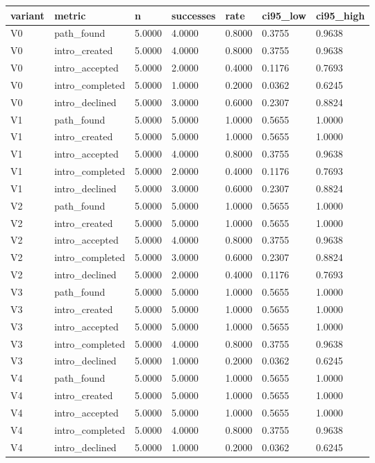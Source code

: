 \begin{tabular}{lllllll}
\toprule
variant & metric & n & successes & rate & ci95_low & ci95_high \\
\midrule
V0 & path_found & 5.0000 & 4.0000 & 0.8000 & 0.3755 & 0.9638 \\
V0 & intro_created & 5.0000 & 4.0000 & 0.8000 & 0.3755 & 0.9638 \\
V0 & intro_accepted & 5.0000 & 2.0000 & 0.4000 & 0.1176 & 0.7693 \\
V0 & intro_completed & 5.0000 & 1.0000 & 0.2000 & 0.0362 & 0.6245 \\
V0 & intro_declined & 5.0000 & 3.0000 & 0.6000 & 0.2307 & 0.8824 \\
V1 & path_found & 5.0000 & 5.0000 & 1.0000 & 0.5655 & 1.0000 \\
V1 & intro_created & 5.0000 & 5.0000 & 1.0000 & 0.5655 & 1.0000 \\
V1 & intro_accepted & 5.0000 & 4.0000 & 0.8000 & 0.3755 & 0.9638 \\
V1 & intro_completed & 5.0000 & 2.0000 & 0.4000 & 0.1176 & 0.7693 \\
V1 & intro_declined & 5.0000 & 3.0000 & 0.6000 & 0.2307 & 0.8824 \\
V2 & path_found & 5.0000 & 5.0000 & 1.0000 & 0.5655 & 1.0000 \\
V2 & intro_created & 5.0000 & 5.0000 & 1.0000 & 0.5655 & 1.0000 \\
V2 & intro_accepted & 5.0000 & 4.0000 & 0.8000 & 0.3755 & 0.9638 \\
V2 & intro_completed & 5.0000 & 3.0000 & 0.6000 & 0.2307 & 0.8824 \\
V2 & intro_declined & 5.0000 & 2.0000 & 0.4000 & 0.1176 & 0.7693 \\
V3 & path_found & 5.0000 & 5.0000 & 1.0000 & 0.5655 & 1.0000 \\
V3 & intro_created & 5.0000 & 5.0000 & 1.0000 & 0.5655 & 1.0000 \\
V3 & intro_accepted & 5.0000 & 5.0000 & 1.0000 & 0.5655 & 1.0000 \\
V3 & intro_completed & 5.0000 & 4.0000 & 0.8000 & 0.3755 & 0.9638 \\
V3 & intro_declined & 5.0000 & 1.0000 & 0.2000 & 0.0362 & 0.6245 \\
V4 & path_found & 5.0000 & 5.0000 & 1.0000 & 0.5655 & 1.0000 \\
V4 & intro_created & 5.0000 & 5.0000 & 1.0000 & 0.5655 & 1.0000 \\
V4 & intro_accepted & 5.0000 & 5.0000 & 1.0000 & 0.5655 & 1.0000 \\
V4 & intro_completed & 5.0000 & 4.0000 & 0.8000 & 0.3755 & 0.9638 \\
V4 & intro_declined & 5.0000 & 1.0000 & 0.2000 & 0.0362 & 0.6245 \\
\bottomrule
\end{tabular}
